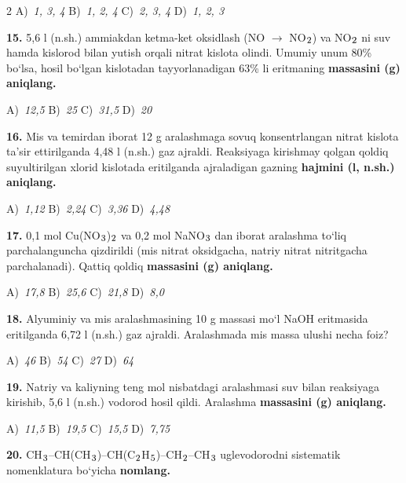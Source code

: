 \documentclass[11pt,a4paper]{article}
\renewcommand{\textsubscript}[1]{\ensuremath{_{\text{\fontsize{8}{8}\selectfont #1}}}}
\begin{document}
\begin{multicols}{2}
\noindent A)~\textsl{1, 3, 4} \hfill B)~\textsl{1, 2, 4} \hfill C)~\textsl{2, 3, 4} \hfill D)~\textsl{1, 2, 3}\par
\vspace{4pt}
\noindent\textbf{15.} 5,6 l (n.sh.) ammiakdan ketma-ket oksidlash (NO $\to$ NO\textsubscript{2}) va NO\textsubscript{2} ni suv hamda kislorod bilan yutish orqali nitrat kislota olindi. Umumiy unum 80\% bo`lsa, hosil bo`lgan kislotadan tayyorlanadigan 63\% li eritmaning \textbf{massasini (g) aniqlang.}

\noindent A)~\textsl{12,5} \hfill B)~\textsl{25} \hfill C)~\textsl{31,5} \hfill D)~\textsl{20}\par
\vspace{4pt}
\noindent\textbf{16.} Mis va temirdan iborat 12 g aralashmaga sovuq konsentrlangan nitrat kislota ta'sir ettirilganda 4,48 l (n.sh.) gaz ajraldi. Reaksiyaga kirishmay qolgan qoldiq suyultirilgan xlorid kislotada eritilganda ajraladigan gazning \textbf{hajmini (l, n.sh.) aniqlang.}

\noindent A)~\textsl{1,12} \hfill B)~\textsl{2,24} \hfill C)~\textsl{3,36} \hfill D)~\textsl{4,48}\par
\vspace{4pt}
\noindent\textbf{17.} 0,1 mol Cu(NO\textsubscript{3})\textsubscript{2} va 0,2 mol NaNO\textsubscript{3} dan iborat aralashma to`liq parchalanguncha qizdirildi (mis nitrat oksidgacha, natriy nitrat nitritgacha parchalanadi). Qattiq qoldiq \textbf{massasini (g) aniqlang.}

\noindent A)~\textsl{17,8} \hfill B)~\textsl{25,6} \hfill C)~\textsl{21,8} \hfill D)~\textsl{8,0}\par
\vspace{4pt}
\noindent\textbf{18.} Alyuminiy va mis aralashmasining 10 g massasi mo`l NaOH eritmasida eritilganda 6,72 l (n.sh.) gaz ajraldi. Aralashmada mis massa ulushi necha foiz?

\noindent A)~\textsl{46} \hfill B)~\textsl{54} \hfill C)~\textsl{27} \hfill D)~\textsl{64}\par
\vspace{4pt}
\noindent\textbf{19.} Natriy va kaliyning teng mol nisbatdagi aralashmasi suv bilan reaksiyaga kirishib, 5,6 l (n.sh.) vodorod hosil qildi. Aralashma \textbf{massasini (g) aniqlang.}

\noindent A)~\textsl{11,5} \hfill B)~\textsl{19,5} \hfill C)~\textsl{15,5} \hfill D)~\textsl{7,75}\par
\vspace{4pt}
\noindent\textbf{20.} CH\textsubscript{3}--CH(CH\textsubscript{3})--CH(C\textsubscript{2}H\textsubscript{5})--CH\textsubscript{2}--CH\textsubscript{3} uglevodorodni sistematik nomenklatura bo`yicha \textbf{nomlang.}


\end{multicols}
\end{document}
